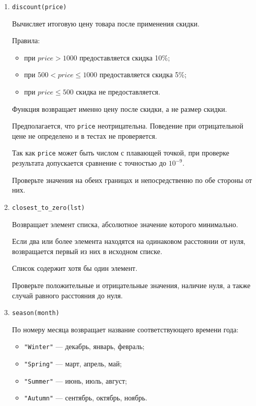 \begin{enumerate}
Проверяет, принадлежит ли точка $(x,y)$ прямоугольнику, заданному двумя
противоположными вершинами $(x1,y1)$ и $(x2,y2)$.

Граница прямоугольника считается частью прямоугольника.

Функция возвращает \texttt{True}, если точка находится внутри
прямоугольника или на его границе, и \texttt{False} в противном случае.

Координаты противоположных вершин могут быть заданы в любом порядке.

\item \texttt{discount(price)}

Вычисляет итоговую цену товара после применения скидки.

Правила:
\begin{itemize}
    \item при $price > 1000$ предоставляется скидка 10\%;
    \item при $500 < price \leq 1000$ предоставляется скидка 5\%;
    \item при $price \leq 500$ скидка не предоставляется.
\end{itemize}

Функция возвращает именно цену после скидки, а не размер скидки.

Предполагается, что \texttt{price} неотрицательна. Поведение при
отрицательной цене не определено и в тестах не проверяется.

Так как \texttt{price} может быть числом с плавающей точкой,
при проверке результата допускается сравнение с точностью до $10^{-9}$.

Проверьте значения на обеих границах и непосредственно по обе стороны
от них.

\item \texttt{closest\_to\_zero(lst)}

Возвращает элемент списка, абсолютное значение которого минимально.

Если два или более элемента находятся на одинаковом расстоянии от нуля,
возвращается первый из них в исходном списке.

Список содержит хотя бы один элемент.

Проверьте положительные и отрицательные значения, наличие нуля,
а также случай равного расстояния до нуля.

\item \texttt{season(month)}

По номеру месяца возвращает название соответствующего времени года:
\begin{itemize}
    \item \texttt{"Winter"} --- декабрь, январь, февраль;
    \item \texttt{"Spring"} --- март, апрель, май;
    \item \texttt{"Summer"} --- июнь, июль, август;
    \item \texttt{"Autumn"} --- сентябрь, октябрь, ноябрь.
\end{itemize}


\end{enumerate}
